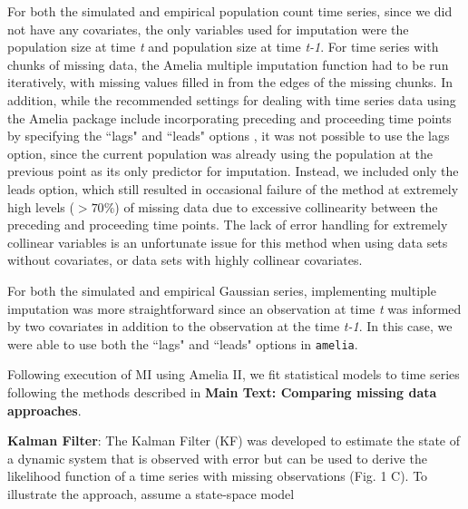 \documentclass[12pt,english]{article} %
\begin{document}
For both the simulated and empirical population count time series, since we did not have any covariates, the only variables used for imputation were the population size at time \textit{t} and population size at time \textit{t-1}. For time series with chunks of missing data, the Amelia multiple imputation function had to be run iteratively, with missing values filled in from the edges of the missing chunks. In addition, while the recommended settings for dealing with time series data using the Amelia package include incorporating preceding and proceeding time points by specifying the ``lags" and ``leads" options \citep{honaker2011}, it was not possible to use the lags option, since the current population was already using the population at the previous point as its only predictor for imputation. Instead, we included only the leads option, which still resulted in occasional failure of the method at extremely high levels ($>70\%$) of missing data due to excessive collinearity between the preceding and proceeding time points. The lack of error handling for extremely collinear variables is an unfortunate issue for this method when using data sets without covariates, or data sets with highly collinear covariates.  

For both the simulated and empirical Gaussian series, implementing multiple imputation was more straightforward since an observation at time \textit{t} was informed by two covariates in addition to the observation at the time \textit{t-1}. In this case, we were able to use both the ``lags" and ``leads" options in \texttt{amelia}. 

Following execution of MI using Amelia II, we fit statistical models to time series following the methods described in \textbf{Main Text: Comparing missing data approaches}.

\textbf{Kalman Filter}: The Kalman Filter (KF) was developed to estimate the state of a dynamic system that is observed with error but can be used to derive the likelihood function of a time series with missing observations (Fig. 1 C). To illustrate the approach, assume a state-space model
\end{document}
